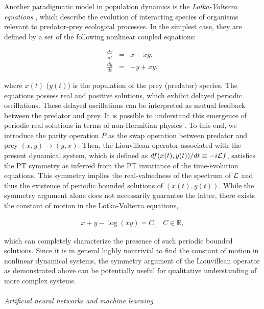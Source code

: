 \documentclass{tADP2e}
\theoremstyle{plain}
\newcommand{\eqn}[1]{
\begin{eqnarray}
	#1
\end{eqnarray}
}
\theoremstyle{plain}
\theoremstyle{definition}
\begin{document}
\vspace{3pt}
\noindent
Another paradigmatic model in population dynamics is the {\emph{Lotka-Volterra equations}} \cite{LAJ10,VVJ28}, which describe the evolution of interacting species of organisms relevant to predator-prey ecological processes. In the simplest case, they are defined by a set of the following nonlinear coupled equations:
 \eqn{\label{LVeq}
\frac{dx}{dt}&=&x-xy,\\
\frac{dy}{dt}&=&-y+xy,
 }
where $x(t)$ ($y(t)$) is the population of the prey (predator) species. The equations 
  possess real and positive solutions, which exhibit delayed periodic oscillations. These delayed oscillations can be interpreted as mutual feedback between the predator and prey. It is possible to understand this emergence of periodic real solutions in terms of non-Hermitian physics  \cite{Bender_2007}. To this end, we introduce the parity operation $P$ as the swap operation between predator and prey $(x,y)\to (y,x)$.   
  Then, the Liouvillean operator associated with the present dynamical system, which is defined as $df(x(t),y(t))/dt\equiv -i{\cal L}f$, satisfies the PT symmetry as inferred from the PT invariance of the time-evolution equations. This symmetry implies the real-valuedness of the spectrum of $\cal L$ and thus the existence of periodic bounded solutions of $(x(t),y(t))$. While the symmetry argument alone does not necessarily guarantee the latter, there exists the constant of motion in the Lotka-Volterra equations,
  \eqn{
 x+y-\log(xy)=C,\;\;\;C\in{\mathbb R},
  } 
  which can completely characterize the presence of such periodic bounded solutions. 
Since it is in general highly nontrivial to find the constant of motion in nonlinear dynamical systems, the symmetry argument of the Liouvillean operator as demonstrated above can be potentially useful for qualitative understanding of more complex systems. 
\\ \\ {\it Artificial neural networks and machine learning}
\end{document}

